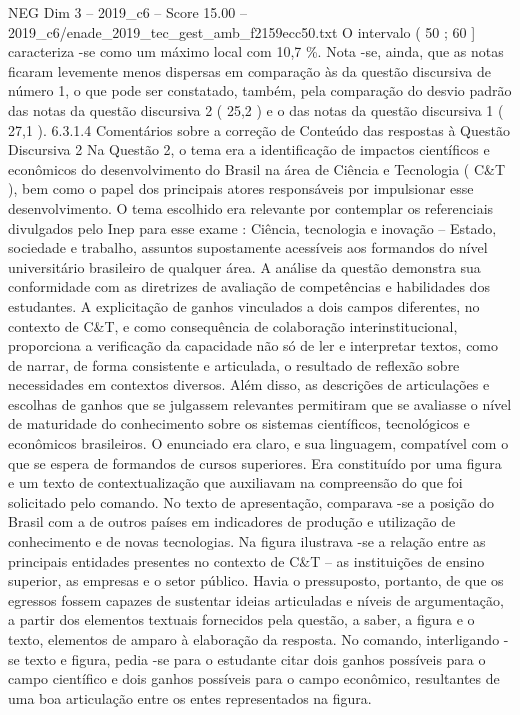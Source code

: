 \begin{textsample}{NEG Dim 3 – 2019\_c6 – Score 15.00 – 2019\_c6/enade\_2019\_tec\_gest\_amb\_f2159ecc50.txt}
O intervalo ( 50 ; 60 ] caracteriza -se como um máximo local com 10,7 \%.
Nota -se, ainda, que as notas ficaram levemente menos dispersas em comparação às da questão discursiva de número 1, o que pode ser constatado, também, pela comparação do desvio padrão das notas da questão discursiva 2 ( 25,2 ) e o das notas da questão discursiva 1 ( 27,1 ). 6.3.1.4 Comentários sobre a correção de Conteúdo das respostas à Questão Discursiva 2 Na Questão 2, o tema era a identificação de impactos científicos e econômicos do desenvolvimento do Brasil na área de Ciência e Tecnologia ( C\&T ), bem como o papel dos principais atores responsáveis por impulsionar esse desenvolvimento.
O tema escolhido era relevante por contemplar os referenciais divulgados pelo Inep para esse exame : Ciência, tecnologia e inovação – Estado, sociedade e trabalho, assuntos supostamente acessíveis aos formandos do nível universitário brasileiro de qualquer área.
A análise da questão demonstra sua conformidade com as diretrizes de avaliação de competências e habilidades dos estudantes.
A explicitação de ganhos vinculados a dois campos diferentes, no contexto de C\&T, e como consequência de colaboração interinstitucional, proporciona a verificação da capacidade não só de ler e interpretar textos, como de narrar, de forma consistente e articulada, o resultado de reflexão sobre necessidades em contextos diversos.
Além disso, as descrições de articulações e escolhas de ganhos que se julgassem relevantes permitiram que se avaliasse o nível de maturidade do conhecimento sobre os sistemas científicos, tecnológicos e econômicos brasileiros.
O enunciado era claro, e sua linguagem, compatível com o que se espera de formandos de cursos superiores.
Era constituído por uma figura e um texto de contextualização que auxiliavam na compreensão do que foi solicitado pelo comando.
No texto de apresentação, comparava -se a posição do Brasil com a de outros países em indicadores de produção e utilização de conhecimento e de novas tecnologias.
Na figura ilustrava -se a relação entre as principais entidades presentes no contexto de C\&T – as instituições de ensino superior, as empresas e o setor público.
Havia o pressuposto, portanto, de que os egressos fossem capazes de sustentar ideias articuladas e níveis de argumentação, a partir dos elementos textuais fornecidos pela questão, a saber, a figura e o texto, elementos de amparo à elaboração da resposta.
No comando, interligando -se texto e figura, pedia -se para o estudante citar dois ganhos possíveis para o campo científico e dois ganhos possíveis para o campo econômico, resultantes de uma boa articulação entre os entes representados na figura.

\end{textsample}
